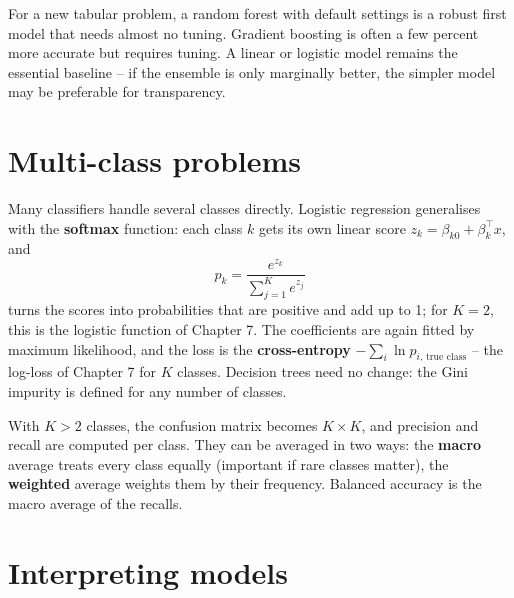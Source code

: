 \documentclass[
  letterpaper,
  DIV=11,
  numbers=noendperiod]{scrreprt}
\begin{document}
\begin{tcolorbox}[enhanced jigsaw, left=2mm, title=\textcolor{quarto-callout-tip-color}{\faLightbulb}\hspace{0.5em}{Engineering practice: which method first?}, opacityback=0, breakable, rightrule=.15mm, arc=.35mm, toptitle=1mm, colbacktitle=quarto-callout-tip-color!10!white, opacitybacktitle=0.6, coltitle=black, colframe=quarto-callout-tip-color-frame, bottomrule=.15mm, leftrule=.75mm, bottomtitle=1mm, titlerule=0mm, toprule=.15mm, colback=white]

For a new tabular problem, a random forest with default settings is a
robust first model that needs almost no tuning. Gradient boosting is
often a few percent more accurate but requires tuning. A linear or
logistic model remains the essential baseline -- if the ensemble is only
marginally better, the simpler model may be preferable for transparency.

\end{tcolorbox}

\section{Multi-class problems}\label{multi-class-problems}

Many classifiers handle several classes directly. Logistic regression
generalises with the \textbf{softmax} function: each class \(k\) gets
its own linear score \(z_k = \beta_{k0} + \beta_k^\top x\), and
\[p_k = \frac{e^{z_k}}{\sum_{j=1}^K e^{z_j}}\] turns the scores into
probabilities that are positive and add up to 1; for \(K = 2\), this is
the logistic function of Chapter 7. The coefficients are again fitted by
maximum likelihood, and the loss is the \textbf{cross-entropy}
\(-\sum_i \ln p_{i,\,\text{true class}}\) -- the log-loss of Chapter 7
for \(K\) classes. Decision trees need no change: the Gini impurity is
defined for any number of classes.

With \(K > 2\) classes, the confusion matrix becomes \(K \times K\), and
precision and recall are computed per class. They can be averaged in two
ways: the \textbf{macro} average treats every class equally (important
if rare classes matter), the \textbf{weighted} average weights them by
their frequency. Balanced accuracy is the macro average of the recalls.

\section{Interpreting models}\label{interpreting-models}
\end{document}
